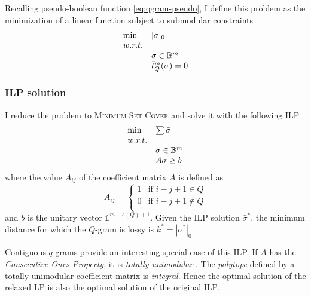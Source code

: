 Recalling pseudo-boolean function \ref{eq:qgram-pseudo}, I define this problem as the minimization of a linear function subject to submodular constraints
\begin{equation}
\begin{array}{ll}
\text{min} & |\sigma|_0			\\
w.r.t.								\\
& \sigma \in \mathbb {B}^m					\\
& \bar{t}_{Q}^{m}(\sigma) = 0	\\
\end{array}
\end{equation}

\subsubsection{ILP solution}

I reduce the problem to \textsc{Minimum Set Cover} \citep{Vazirani2001} and solve it with the following ILP
\begin{equation}
\begin{array}{ll}
\text{min} & \sum \bar{\sigma}	\\
w.r.t.						\\
& \sigma \in \mathbb {B}^m			\\
& A\sigma \geq b	\\
\end{array}
\end{equation}
where the value $A_{ij}$ of the coefficient matrix $A$ is defined as
\begin{equation}
A_{ij} = 
\left\{
	\begin{array}{ll}
		1  & \mbox{if } i-j+1 \in Q		\\
		0  & \mbox{if } i-j+1 \notin Q	\\
	\end{array}
\right.
\end{equation}
and $b$ is the unitary vector $\mathbb{1}^{m - s(Q) + 1}$.
Given the ILP solution $\bar{\sigma}^*$, the minimum distance for which the $Q$-gram is lossy is $k^* = |\sigma^*|_0$.

\begin{observation}
Contiguous $q$-grams provide an interesting special case of this ILP.
If $A$ has the \emph{Consecutive Ones Property}, it is \emph{totally unimodular} \citep{Fulkerson1964}.
The \emph{polytope} defined by a totally unimodular coefficient matrix is \emph{integral}.
Hence the optimal solution of the relaxed LP is also the optimal solution of the original ILP.
\end{observation}

